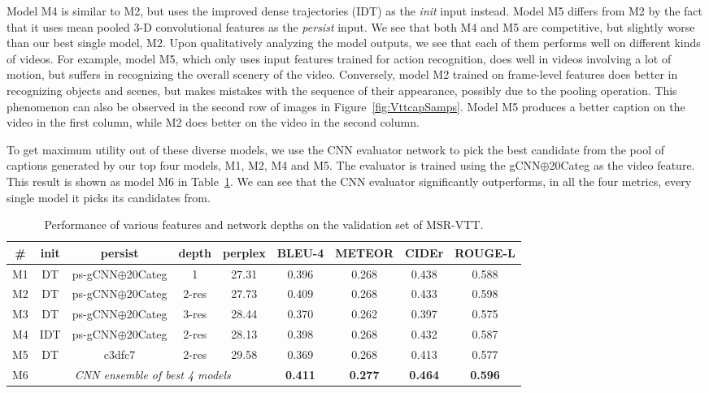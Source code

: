 Model M4 is similar to M2, but uses the improved dense trajectories (IDT) as
the \emph{init} input instead.
Model M5 differs from M2 by the fact that it uses mean pooled 3-D
convolutional features as the \emph{persist} input.
We see that both M4 and M5 are competitive, but slightly worse than our best
single model, M2.
Upon qualitatively analyzing the model outputs, we see that each of them
performs well on different kinds of videos.
For example, model M5, which only uses input features trained for action
recognition, does well in videos involving a lot of motion, but suffers in
recognizing the overall scenery of the video.
Conversely, model M2 trained on frame-level features does better in recognizing
objects and scenes, but makes mistakes with the sequence of their appearance,
possibly due to the pooling operation.
This phenomenon can also be observed in the second row of images in
Figure~\ref{fig:VttcapSamps}. Model M5 produces a better caption on the video in
the first column, while M2 does better on the video in the second column.

To get maximum utility out of these diverse models, we use the CNN evaluator
network to pick the best candidate from the pool of captions generated by our
top four models, M1, M2, M4 and M5.
The evaluator is trained using the gCNN$\oplus$20Categ as the video feature.
This result is shown as model M6 in Table~\ref{tab:resVttFeat}.
We can see that the CNN evaluator significantly outperforms, in all the four
metrics, every single model it picks its candidates from.

\begin{table}[thp]
  \centering
  \begin{adjustbox}{center}
  \newcommand{\bs}{\small\bf}
  \begin{tabular}{|c|c|c|c|c|c|c|c|c|}
    \hline
    \bs\# &\bs init &\bs persist &\bs depth &\bs perplex &\bs BLEU-4 &\bs METEOR &\bs CIDEr &\bs ROUGE-L \\\hline\hline
    M1 & DT  & ps-gCNN$\oplus$20Categ & 1  & 27.31 & 0.396 & 0.268 & 0.438 & 0.588 \\
    M2 & DT  & ps-gCNN$\oplus$20Categ & 2-res  & 27.73 & 0.409 & 0.268 & 0.433 & 0.598 \\
    M3 & DT  & ps-gCNN$\oplus$20Categ & 3-res  & 28.44 & 0.370 & 0.262 & 0.397 & 0.575 \\\hline
    M4 & IDT & ps-gCNN$\oplus$20Categ & 2-res  & 28.13 & 0.398 & 0.268 & 0.432 & 0.587 \\
    M5 & DT  & c3dfc7       & 2-res  & 29.58 & 0.369 & 0.268 & 0.413 & 0.577 \\\hline
    M6 & \multicolumn{4}{c|}{\em CNN ensemble of best 4 models}
                                  & \bf0.411 & \bf0.277 & \bf0.464 & \bf0.596 \\\hline
    \hline
  \end{tabular}
  \end{adjustbox}
  \caption{Performance of various features and network depths on the validation
  set of MSR-VTT.}
  \label{tab:resVttFeat}
\end{table}

